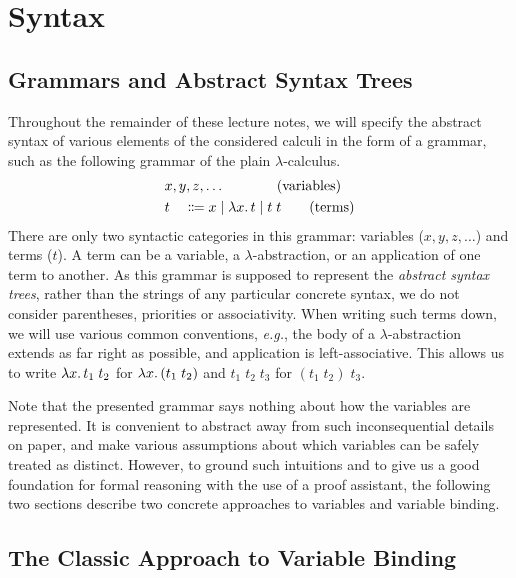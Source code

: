 \chapter{Syntax}

\section{Grammars and Abstract Syntax Trees}

Throughout the remainder of these lecture notes, we will specify the abstract
syntax of various elements of the considered calculi in the form of a grammar,
such as the following grammar of the plain $\lambda$-calculus.
\begin{alignat*}{2}
  &x, y, z, \dots \span\span \tag{variables} \\
  &t &&\Coloneqq x \mid \lambda x\ldotp t \mid t\;t \tag{terms}
\end{alignat*}
There are only two syntactic categories in this grammar: variables
($x, y, z, \dots$) and terms ($t$). A term can be a variable,
a $\lambda$-abstraction, or an application of one term to another.
As this grammar is supposed to represent the \emph{abstract syntax trees},
rather than the strings of any particular concrete syntax, we do not consider
parentheses, priorities or associativity. When writing such
terms down, we will use various common conventions, \emph{e.g.}, the
body of a $\lambda$-abstraction extends as far right as possible, and
application is left-associative. This allows us to write
$\lambda x\ldotp t_1\;t_2$ for $\lambda x\ldotp (t_1\;t_2)$
and $t_1\;t_2\;t_3$ for $(t_1\;t_2)\;t_3$.

Note that the presented grammar says nothing about how the variables are
represented. It is convenient to abstract away from such
inconsequential details on paper, and make various assumptions about which
variables can be safely treated as distinct. However, to ground such
intuitions and to give us a good foundation for formal reasoning with
the use of a proof assistant, the following two sections describe
two concrete approaches to variables and variable binding.

\section{The Classic Approach to Variable Binding}

